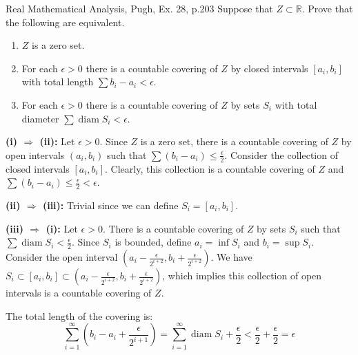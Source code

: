 \begin{problem}{}{}{Real Mathematical Analysis, Pugh, Ex. 28, p.203}
Suppose that $Z \subset \mathbb{R}$. Prove that the following are equivalent.
\begin{enumerate}
    \item[(i)] $Z$ is a zero set.
    \item[(ii)] For each $\epsilon > 0$ there is a countable covering of $Z$ by closed intervals $[a_i, b_i]$ with total length $\sum b_i - a_i < \epsilon$.
    \item[(iii)] For each $\epsilon > 0$ there is a countable covering of $Z$ by sets $S_i$ with total diameter $\sum \operatorname{diam} S_i < \epsilon$.
\end{enumerate}
\end{problem}

\begin{solution}
    \textbf{(i) $\Rightarrow$ (ii):} Let $\epsilon > 0$. Since $Z$ is a zero set, there is a countable covering of $Z$ by open intervals $(a_i, b_i)$ such that $\sum (b_i - a_i) \leq \frac{\epsilon}{2}$.
    Consider the collection of closed intervals $[a_i, b_i]$. Clearly, this collection is a countable covering of $Z$ and $\sum (b_i - a_i) \leq \frac{\epsilon}{2} < \epsilon$.

    \textbf{(ii) $\Rightarrow$ (iii):} Trivial since we can define $S_i = [a_i, b_i]$.

    \textbf{(iii) $\Rightarrow$ (i):} Let $\epsilon > 0$. There is a countable covering of $Z$ by sets $S_i$ such that $\sum \operatorname{diam} S_i < \frac{\epsilon}{2}$.
    Since $S_i$ is bounded, define $a_i = \inf S_i$ and $b_i = \sup S_i$.
    Consider the open interval $\left(a_i - \frac{\epsilon}{2^{i+2}}, b_i + \frac{\epsilon}{2^{i+2}}\right)$. We have $S_i \subset [a_i, b_i] \subset \left(a_i - \frac{\epsilon}{2^{i+2}}, b_i + \frac{\epsilon}{2^{i+2}}\right)$, which implies this collection of open intervals is a countable covering of $Z$.

    The total length of the covering is:
    \[
        \sum_{i=1}^{\infty} \left(b_i - a_i + \frac{\epsilon}{2^{i+1}}\right) = \sum_{i=1}^{\infty} \operatorname{diam} S_i + \frac{\epsilon}{2} < \frac{\epsilon}{2} + \frac{\epsilon}{2} = \epsilon
    \]
\end{solution}
